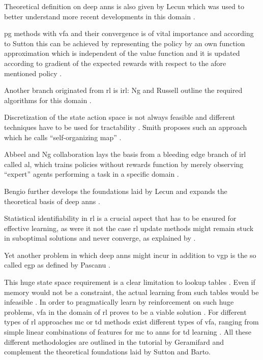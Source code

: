 \documentclass{seal_thesis}
\begin{document}
Theoretical definition on deep \glspl{ann} is also given by Lecun \etal which was used to better understand more recent developments in this domain \cite{Lecun1998}.

\gls{pg} methods with \gls{vfa} and their convergence is of vital importance and according to Sutton \etal this can be achieved by representing the policy by an own function approximation which is independent of the value function and it is updated according to gradient of the expected rewards with respect to the afore mentioned policy \cite{Sutton1999}.

Another branch originated from \gls{rl} is \gls{irl}: Ng and Russell outline the required algorithms for this domain \cite{Ng2000}.

Discretization of the state action space is not always feasible and different techniques have to be used for tractability \cite{Smith2002}. Smith proposes such an approach which he calls ``self-organizing map'' \cite{Smith2002}.

Abbeel and Ng collaboration lays the basis from a bleeding edge branch of \gls{irl} called \gls{al}, which trains policies without rewards function by merely observing ``expert'' agents performing a task in a specific domain \cite{Abbeel2004}.

Bengio further develops the foundations laid by Lecun and expands the theoretical basis of deep \glspl{ann} \cite{Bengio2009}.

Statistical identifiability in \gls{rl} is a crucial aspect that has to be ensured for effective learning, as were it not the case \gls{rl} update methods might remain stuck in suboptimal solutions and never converge, as explained by \cite{Zhang2011}.

Yet another problem in which deep \glspl{ann} might incur in addition to \gls{vgp} is the so called \gls{egp} as defined by Pascanu \etal \cite{Pascanu2012}.

This huge state space requirement is a clear limitation to lookup tables \cite{Sutton2017}. Even if memory would not be a constraint, the actual learning from such tables would be infeasible \cite{Sutton2017}. In order to pragmatically learn by reinforcement on such huge problems, \gls{vfa} in the domain of \gls{rl} proves to be a viable solution \cite{Sutton2017}. For different types of \gls{rl} approaches \ie \gls{mc} or \gls{td} methods exist different types of \gls{vfa}, ranging from simple linear combinations of features for \gls{mc} to \glspl{ann} for \gls{td} learning \cite{Sutton2017}. All these different methodologies are outlined in the tutorial by Geramifard \etal \cite{Geramifard2013} and complement the theoretical foundations laid by Sutton and Barto.
\end{document}
